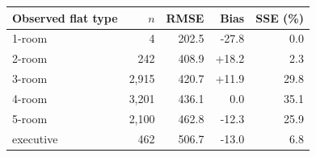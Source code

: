\begin{tabular}{lrrrr}
\toprule
Observed flat type & $n$ & RMSE & Bias & SSE (\%) \\
\midrule
1-room & 4 & 202.5 & -27.8 & 0.0 \\
2-room & 242 & 408.9 & +18.2 & 2.3 \\
3-room & 2,915 & 420.7 & +11.9 & 29.8 \\
4-room & 3,201 & 436.1 & 0.0 & 35.1 \\
5-room & 2,100 & 462.8 & -12.3 & 25.9 \\
executive & 462 & 506.7 & -13.0 & 6.8 \\
\bottomrule
\end{tabular}
